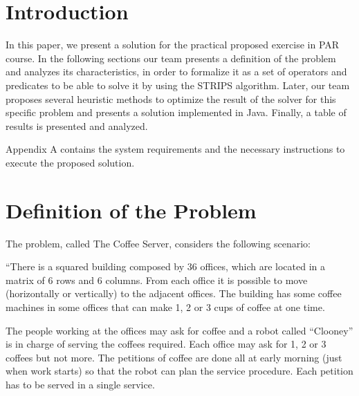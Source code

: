 \documentclass[12pt,a4paper,oneside]{article}
\numberwithin{equation}{section}
\numberwithin{equation}{section}
\theoremstyle{definition}
\begin{document}
\newpage


\renewcommand*{\contentsname}{Index of contents}
\tableofcontents

\newpage

\pagestyle{fancy}
\setcounter{page}{1}

\section{Introduction} \label{Introduction}

In this paper, we present a solution for the practical proposed exercise\cite{problemdefinition} in PAR course\cite{par}. In the following sections our team presents a definition of the problem and analyzes its characteristics, in order to formalize it as a set of operators and predicates to be able to solve it by using the STRIPS algorithm\cite{strips}. Later, our team proposes several heuristic methods to optimize the result of the solver for this specific problem and presents a solution implemented in Java\cite{java}. Finally, a table of results is presented and analyzed.


Appendix A contains the system requirements and the necessary instructions to execute the proposed solution.

\newpage

\section{Definition of the Problem} \label{Definition of the Problem}

The problem, called The Coffee Server\cite{problemdefinition}, considers the following scenario:


“There is a squared building composed by 36 offices, which are located in a matrix of 6 rows and 6 columns. From each office it is possible to move (horizontally or vertically) to the adjacent offices. The building has some coffee machines in some offices that can make 1, 2 or 3 cups of coffee at one time.


The people working at the offices may ask for coffee and a robot called “Clooney” is in charge of serving the coffees required. Each office may ask for 1, 2 or 3 coffees but not more. The petitions of coffee are done all at early morning (just when work starts) so that the robot can plan the service procedure. Each petition has to be served in a single service.
\end{document}
